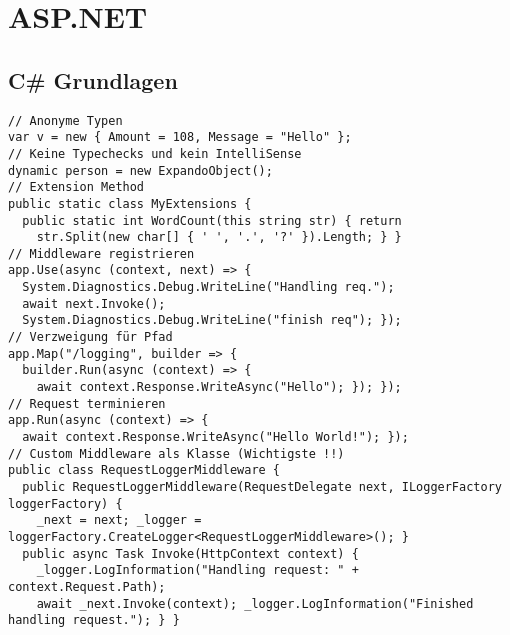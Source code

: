 
\section{ASP.NET}
\subsection{C\# Grundlagen}
\begin{lstlisting}[style=csh]
// Anonyme Typen
var v = new { Amount = 108, Message = "Hello" };
// Keine Typechecks und kein IntelliSense
dynamic person = new ExpandoObject();
// Extension Method
public static class MyExtensions {
  public static int WordCount(this string str) { return
    str.Split(new char[] { ' ', '.', '?' }).Length; } }
// Middleware registrieren
app.Use(async (context, next) => {
  System.Diagnostics.Debug.WriteLine("Handling req.");
  await next.Invoke();
  System.Diagnostics.Debug.WriteLine("finish req"); });
// Verzweigung für Pfad
app.Map("/logging", builder => {
  builder.Run(async (context) => {
    await context.Response.WriteAsync("Hello"); }); });
// Request terminieren
app.Run(async (context) => {
  await context.Response.WriteAsync("Hello World!"); });
// Custom Middleware als Klasse (Wichtigste !!)
public class RequestLoggerMiddleware {
  public RequestLoggerMiddleware(RequestDelegate next, ILoggerFactory loggerFactory) {
    _next = next; _logger = loggerFactory.CreateLogger<RequestLoggerMiddleware>(); }
  public async Task Invoke(HttpContext context) {
    _logger.LogInformation("Handling request: " + context.Request.Path);
    await _next.Invoke(context); _logger.LogInformation("Finished handling request."); } }
\end{lstlisting}
